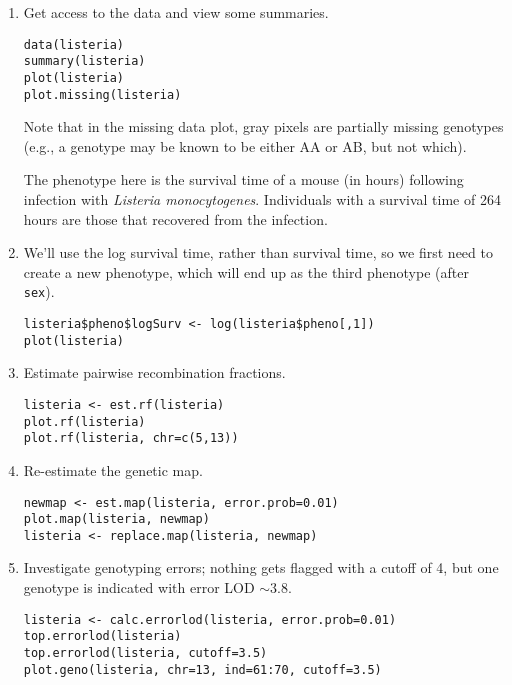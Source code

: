 \documentclass[10pt,letterpaper]{article}
\newcommand{\usercolor}{\color [named]{BlueViolet}}
\begin{document}
\begin{enumerate}
\item Get access to the data and view some summaries.

\usercolor 
\verb|data(listeria)| \\
\verb|summary(listeria)| \\
\verb|plot(listeria)| \\
\verb|plot.missing(listeria)| 
\normalcolor

Note that in the missing data plot, gray pixels are partially missing
genotypes (e.g., a genotype may be known to be either AA or AB, but
not which).

The phenotype here is the survival time of a mouse (in hours)
following infection with \emph{Listeria monocytogenes}.  Individuals
with a survival time of 264 hours are those that recovered from the
infection.

\item We'll use the log survival time, rather than survival time, so
  we first need to create a new phenotype, which will end up as the
  third phenotype (after \verb-sex-).

\usercolor
\verb|listeria$pheno$logSurv <- log(listeria$pheno[,1])| \\ %
\verb|plot(listeria)| \normalcolor

\item Estimate pairwise recombination fractions.

\usercolor \verb|listeria <- est.rf(listeria)| \\
\verb|plot.rf(listeria)| \\
\verb|plot.rf(listeria, chr=c(5,13))| 
\normalcolor

\item Re-estimate the genetic map. 
 
\usercolor 
\verb|newmap <- est.map(listeria, error.prob=0.01)| \\
\verb|plot.map(listeria, newmap)| \\
\verb|listeria <- replace.map(listeria, newmap)|
\normalcolor

\item Investigate genotyping errors; nothing gets flagged with a
  cutoff of 4, but one genotype is indicated with error LOD
  $\sim$3.8. 

\usercolor 
\verb|listeria <- calc.errorlod(listeria, error.prob=0.01)| \\
\verb|top.errorlod(listeria)| \\
\verb|top.errorlod(listeria, cutoff=3.5)| \\
\verb|plot.geno(listeria, chr=13, ind=61:70, cutoff=3.5)|
\normalcolor


\end{enumerate}
\end{document}
